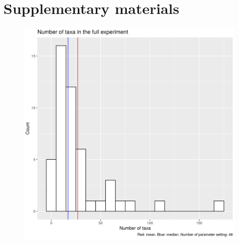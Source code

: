 \section{Supplementary materials}

\begin{figure}[!htbp]
  \includegraphics[width=\textwidth]{20190829_fig_n_taxa.png}
  \label{fig:n_taxa}
\end{figure}


